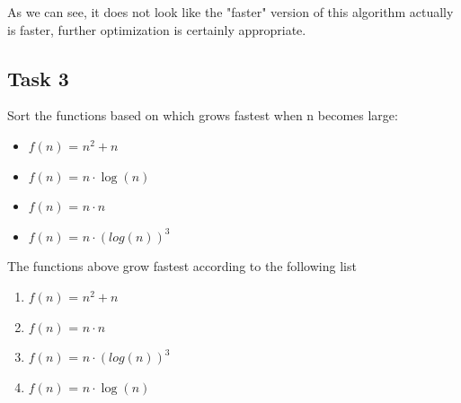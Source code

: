 \documentclass{article}
\begin{document}
As we can see, it does not look like the "faster" version of this algorithm actually is faster, further optimization is certainly appropriate.

\subsection{Task 3}
Sort the functions based on which grows fastest when n becomes large:

\begin{itemize}
\item \(f(n)\) = \( n^2 + n \)
\item \(f(n)\) = \( n \cdot  \log (n) \)
\item \(f(n)\) = \( n \cdot  n \)
\item \(f(n)\) = \( n \cdot  (log(n))^3 \)
\end{itemize}
\newpage 

The functions above grow fastest according to the following list

\begin{enumerate}
    \item \(f(n)\) = \( n^2 + n \)
    \item \(f(n)\) = \( n \cdot  n \)
    \item \(f(n)\) = \( n \cdot  (log(n))^3 \)
    \item \(f(n)\) = \( n \cdot \log (n) \)
\end{enumerate}
\end{document}
